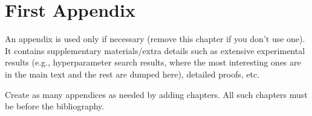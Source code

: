 \documentclass{report}
\begin{document}
\appendix

\chapter{First Appendix}

An appendix is used only if necessary (remove this chapter if you don't use one). It contains supplementary materials/extra details such as extensive experimental results (e.g., hyperparameter search results, where the most interesting ones are in the main text and the rest are dumped here), detailed proofs, etc. 

Create as many appendices as needed by adding chapters. All such chapters must be before the bibliography. 




\end{document}
